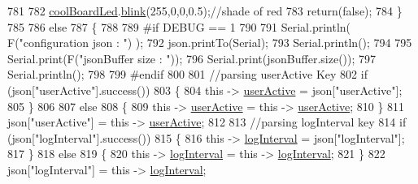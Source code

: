 \begin{DoxyCode}
781     
782             \hyperlink{class_cool_board_a1b1d3c684a5baa56b08486e192fd8e97}{coolBoardLed}.\hyperlink{class_cool_board_led_a96e1ea13003eee34c9dbcef340404426}{blink}(255,0,0,0.5);\textcolor{comment}{//shade of red     }
783             \textcolor{keywordflow}{return}(\textcolor{keyword}{false});
784         \}
785 
786         \textcolor{keywordflow}{else}
787         \{   
788         
789 \textcolor{preprocessor}{        #if DEBUG == 1}
790             
791             Serial.println( F(\textcolor{stringliteral}{"configuration json : "}) );
792             json.printTo(Serial);
793             Serial.println();
794             
795             Serial.print(F(\textcolor{stringliteral}{"jsonBuffer size : "}));
796             Serial.print(jsonBuffer.size());
797             Serial.println();
798 
799 \textcolor{preprocessor}{        #endif}
800             
801             \textcolor{comment}{//parsing userActive Key}
802             \textcolor{keywordflow}{if} (json[\textcolor{stringliteral}{"userActive"}].success())
803             \{
804                 \textcolor{keyword}{this} -> \hyperlink{class_cool_board_a6395459131d6889a3005f79c7a35e964}{userActive} = json[\textcolor{stringliteral}{"userActive"}];
805             \}
806 
807             \textcolor{keywordflow}{else}
808             \{
809                 \textcolor{keyword}{this} -> \hyperlink{class_cool_board_a6395459131d6889a3005f79c7a35e964}{userActive} = \textcolor{keyword}{this} -> \hyperlink{class_cool_board_a6395459131d6889a3005f79c7a35e964}{userActive};
810             \}
811             json[\textcolor{stringliteral}{"userActive"}] = \textcolor{keyword}{this} -> \hyperlink{class_cool_board_a6395459131d6889a3005f79c7a35e964}{userActive};
812 
813             \textcolor{comment}{//parsing logInterval key}
814             \textcolor{keywordflow}{if} (json[\textcolor{stringliteral}{"logInterval"}].success())
815             \{
816                 \textcolor{keyword}{this} -> \hyperlink{class_cool_board_a84bc94413b64973e4aba8c467c97006c}{logInterval} = json[\textcolor{stringliteral}{"logInterval"}];
817             \}
818             \textcolor{keywordflow}{else}
819             \{
820                 \textcolor{keyword}{this} -> \hyperlink{class_cool_board_a84bc94413b64973e4aba8c467c97006c}{logInterval} = \textcolor{keyword}{this} -> \hyperlink{class_cool_board_a84bc94413b64973e4aba8c467c97006c}{logInterval};
821             \}
822             json[\textcolor{stringliteral}{"logInterval"}] = \textcolor{keyword}{this} -> \hyperlink{class_cool_board_a84bc94413b64973e4aba8c467c97006c}{logInterval};

\end{DoxyCode}
